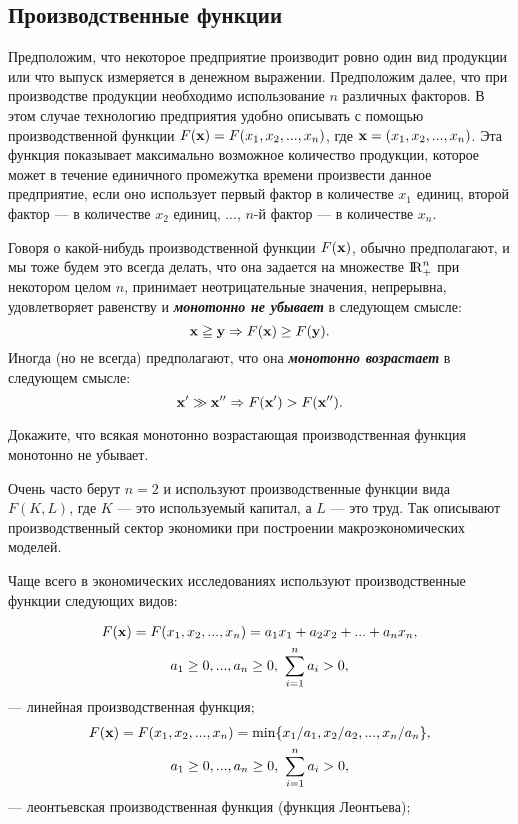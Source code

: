 \subsection{Производственные функции}

        Предположим, что некоторое предприятие производит ровно один вид
         продукции или что выпуск измеряется в денежном выражении.
         Предположим далее, что при производстве продукции необходимо использование
         $n$ различных факторов. В этом случае технологию предприятия удобно
          описывать с помощью производственной функции $F(\mathbf{x})=F(x_{1},x_{2},...,x_{n})$,
          где $\mathbf{x}=(x_{1},x_{2},...,x_{n})$. Эта функция показывает максимально возможное
           количество продукции, которое может в течение единичного промежутка времени
           произвести данное предприятие,
           если оно использует первый фактор в количестве $x_{1}$ единиц, второй
           фактор --- в количестве $x_{2}$ единиц, ..., $n$-й фактор --- в количестве $x_{n}$.

           Говоря о какой-нибудь производственной функции $F(\mathbf{x})$,
           обычно предполагают, и мы тоже будем
           это всегда делать, что она задается на
           множестве  ${\rm I\!R}^{n}_{+}$ при некотором целом $n$, принимает
           неотрицательные значения, непрерывна, удовлетворяет равенству
           и \textbf{\emph{монотонно не убывает}} в следующем смысле:
\[
    \mathbf{x}\geqq\mathbf{y}\Rightarrow F(\mathbf{x})\geq F(\mathbf{y}).
\]
           Иногда (но не всегда) предполагают, что она
           \textbf{\emph{монотонно возрастает}} в следующем смысле:
\[
    \mathbf{x'}\gg\mathbf{x''}\Rightarrow F(\mathbf{x'})>F(\mathbf{x''}).
\]

\begin{exer}
    Докажите, что всякая монотонно возрастающая производственная
    функция монотонно не убывает.
\end{exer}



            Очень часто берут $n=2$ и используют производственные
            функции вида $F(K,L)$, где $K$ --- это используемый капитал, а $L$ --- это труд.
            Так описывают производственный сектор экономики при
            построении макроэкономических моделей.


             Чаще всего в экономических исследованиях используют производственные
             функции следующих видов:



\begin{multline*}
    F(\mathbf{x})=F(x_{1},x_{2},...,x_{n})=a_{1}x_{1}+a_{2}x_{2}+...+a_{n}x_{n},
    \\
    a_{1}\geq0,...,a_{n}\geq0, \ \sum_{i=1}^{n}a_{i}>0,
\end{multline*}
     --- линейная производственная функция;
\begin{multline*}
    F(\mathbf{x})=F(x_{1},x_{2},...,x_{n})=\min\{x_{1}/a_{1},x_{2}/a_{2},...,x_{n}/a_{n}\},     \\
    a_{1}\geq0,...,a_{n}\geq0, \ \sum_{i=1}^{n}a_{i}>0,
\end{multline*}
    --- леонтьевская производственная функция (функция Леонтьева);

